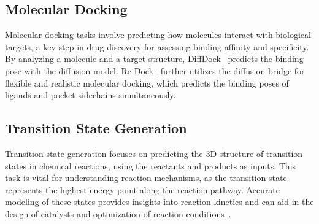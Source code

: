 \subsection{Molecular Docking}
Molecular docking tasks involve predicting how molecules interact with biological targets, a key step in drug discovery for assessing binding affinity and specificity. By analyzing a molecule and a target structure, DiffDock~\citep{DiffDock} predicts the binding pose with the diffusion model.
Re-Dock~\citep{Re-Dock} further utilizes the diffusion bridge for flexible and realistic molecular docking, which predicts the binding poses of ligands and pocket sidechains simultaneously.



\subsection{Transition State Generation}
Transition state generation focuses on predicting the 3D structure of transition states in chemical reactions, using the reactants and products as inputs. This task is vital for understanding reaction mechanisms, as the transition state represents the highest energy point along the reaction pathway. Accurate modeling of these states provides insights into reaction kinetics and can aid in the design of catalysts and optimization of reaction conditions~\citep{OA-ReactDiff}.